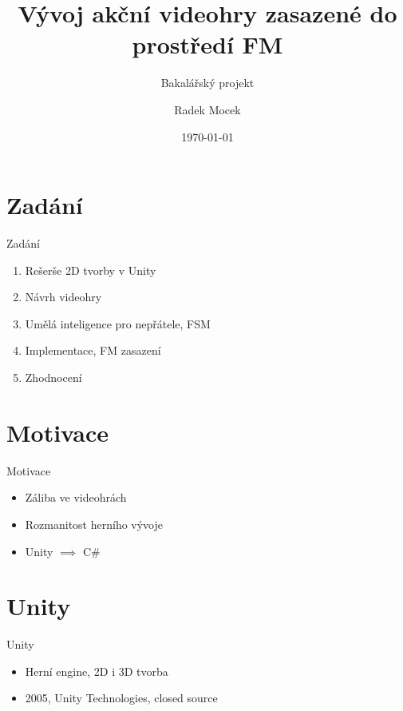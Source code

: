 \documentclass[10pt]{beamer}
\title{Vývoj akční videohry zasazené do prostředí FM}
\subtitle{Bakalářský projekt}
\author{Radek Mocek}
\date{\today}
\begin{document}
	
	{
	\frame[noframenumbering]{\titlepage} %
	}
	

	\section{Zadání} %
	\begin{frame}{Zadání} %
		\begin{enumerate} \setlength\itemsep{10pt} %
			\item Rešerše 2D tvorby v Unity
			\item Návrh videohry
			\item Umělá inteligence pro nepřátele, FSM
			\item Implementace, FM zasazení
			\item Zhodnocení
		\end{enumerate}
	\end{frame}

	\section{Motivace}
	\begin{frame}{Motivace}
		\begin{itemize}\setlength\itemsep{10pt} %
			\item Záliba ve videohrách
			\item Rozmanitost herního vývoje
			\item Unity $\implies$ C\#
		\end{itemize}
	\end{frame}
	
	\section{Unity}
	\begin{frame}{Unity}
		\begin{itemize}\setlength\itemsep{10pt}
			\item Herní engine, 2D i 3D tvorba
			\item 2005, Unity Technologies, closed source
		\end{itemize}
		\vfill
		\begin{bchart}[max=108,plain,unit=\ 000,scale=1.2]
		\end{bchart}
	\end{frame}
	
\end{document}
